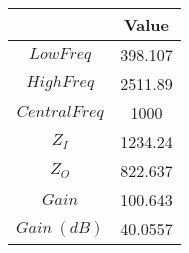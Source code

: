 \begin{tabular}{cc}
\toprule
 & Value\\ \midrule
$LowFreq$ & 398.107 \\
$HighFreq$ & 2511.89 \\
$CentralFreq$ & 1000 \\
$Z_{I}$ & 1234.24 \\
$Z_{O}$ & 822.637 \\
$Gain$ & 100.643 \\
$Gain\ (dB)$ & 40.0557 \\ \bottomrule
\end{tabular}